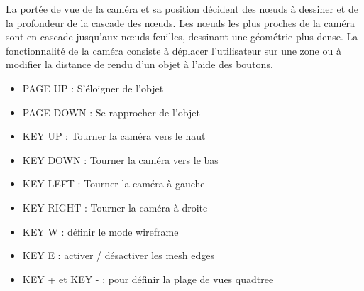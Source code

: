 \documentclass[12pt]{report}
\begin{document}
\begin{enumerate}
\begin{enumerate}
        La portée de vue de la caméra et sa position décident des nœuds à dessiner et de la profondeur de la cascade des nœuds. Les nœuds les plus proches de la caméra sont en cascade jusqu'aux nœuds feuilles, dessinant une géométrie plus dense. La fonctionnalité de la caméra consiste à déplacer l'utilisateur sur une zone ou à modifier la distance de rendu d'un objet à l'aide des boutons. 
        \begin{itemize}
            \item PAGE UP : S'éloigner de l'objet
            \item PAGE DOWN : Se rapprocher de l'objet
            \item KEY UP : Tourner la caméra vers le haut
            \item KEY DOWN : Tourner la caméra vers le bas
            \item KEY LEFT : Tourner la caméra à gauche
            \item KEY RIGHT : Tourner la caméra à droite
            \item KEY W : définir le mode wireframe
            \item KEY E : activer / désactiver les mesh edges
            \item KEY + et KEY - : pour définir la plage de vues quadtree
        \end{itemize}
        

\end{enumerate}
\end{enumerate}
\end{document}
